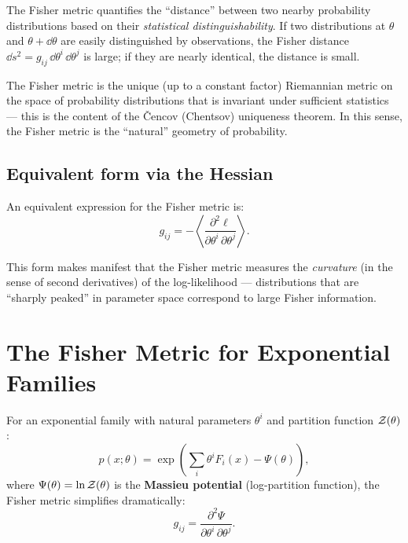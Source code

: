 The Fisher metric quantifies the ``distance'' between two nearby probability distributions based on their \emph{statistical distinguishability}. If two distributions at $\theta$ and $\theta + \dd\theta$ are easily distinguished by observations, the Fisher distance $\dd s^2 = g_{ij}\,\dd\theta^i\,\dd\theta^j$ is large; if they are nearly identical, the distance is small.

\begin{remark}
The Fisher metric is the unique (up to a constant factor) Riemannian metric on the space of probability distributions that is invariant under sufficient statistics --- this is the content of the \v{C}encov (Chentsov) uniqueness theorem. In this sense, the Fisher metric is the ``natural'' geometry of probability.
\end{remark}

\subsection{Equivalent form via the Hessian}

An equivalent expression for the Fisher metric is:
\begin{equation}
g_{ij} = -\left\langle \frac{\partial^2 \ell}{\partial\theta^i\,\partial\theta^j} \right\rangle.
\end{equation}

This form makes manifest that the Fisher metric measures the \emph{curvature} (in the sense of second derivatives) of the log-likelihood --- distributions that are ``sharply peaked'' in parameter space correspond to large Fisher information.

\section{The Fisher Metric for Exponential Families}

For an exponential family with natural parameters $\theta^i$ and partition function $\mathcal{Z}(\theta)$:
\begin{equation}
p(x; \theta) = \exp\!\left(\sum_i \theta^i F_i(x) - \Psi(\theta)\right),
\end{equation}
where $\Psi(\theta) = \ln\mathcal{Z}(\theta)$ is the \textbf{Massieu potential} (log-partition function), the Fisher metric simplifies dramatically:
\begin{equation}
\boxed{g_{ij} = \frac{\partial^2 \Psi}{\partial\theta^i\,\partial\theta^j}.}
\end{equation}

